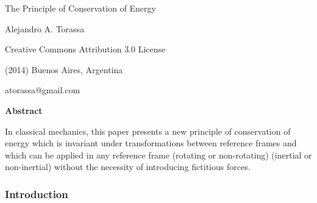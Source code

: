 \documentclass[10pt]{article}
\begin{document}
\begin{center}

{\LARGE The Principle of Conservation of Energy}

\bigskip \medskip

Alejandro A. Torassa

\bigskip \medskip

\footnotesize

Creative Commons Attribution 3.0 License

(2014) Buenos Aires, Argentina

atorassa@gmail.com

\bigskip \smallskip

\small

{\bf Abstract}

\bigskip

\parbox{96mm}{In classical mechanics, this paper presents a new principle of conservation of energy which is invariant under transformations between reference frames and which can be applied in any reference frame (rotating or non-rotating) (inertial or non-inertial) without the necessity of introducing fictitious forces.}

\end{center}

\normalsize

\vspace{-0.60em}

{\centering\subsubsection*{Introduction}}

\vspace{+0.90em}
\end{document}
